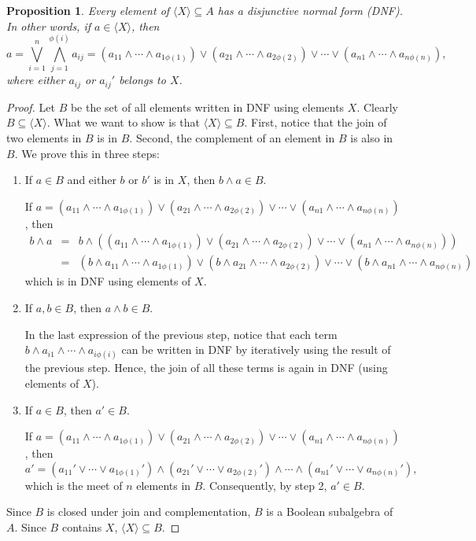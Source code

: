 \documentclass[12pt]{article}
\newtheorem{prop}{Proposition}
\begin{document}
\begin{prop}  Every element of $\langle X\rangle \subseteq A$ has a disjunctive normal form (DNF).  In other words, if $a\in \langle X\rangle$, then $$a=\bigvee_{i=1}^{n} \bigwedge_{j=1}^{\phi(i)} a_{ij}=(a_{11}\wedge \cdots \wedge a_{1\phi(1)})\vee (a_{21}\wedge \cdots \wedge a_{2\phi(2)}) \vee \cdots \vee (a_{n1}\wedge \cdots \wedge a_{n\phi(n)}),$$ where either $a_{ij}$ or $a_{ij}'$ belongs to $X$.
\end{prop}
\begin{proof}
Let $B$ be the set of all elements written in DNF using elements $X$.  Clearly $B\subseteq \langle X\rangle$.  What we want to show is that $\langle X\rangle \subseteq B$.  First, notice that the join of two elements in $B$ is in $B$.  Second, the complement of an element in $B$ is also in $B$.  We prove this in three steps:
\begin{enumerate}
\item If $a\in B$ and either $b$ or $b'$ is in $X$, then $b\wedge a\in B$.  

If $a=(a_{11}\wedge \cdots \wedge a_{1\phi(1)})\vee (a_{21}\wedge \cdots \wedge a_{2\phi(2)}) \vee \cdots \vee (a_{n1}\wedge \cdots \wedge a_{n\phi(n)})$, then 
\begin{eqnarray*}
b\wedge a &=& b\wedge ((a_{11}\wedge \cdots \wedge a_{1\phi(1)})\vee (a_{21}\wedge \cdots \wedge a_{2\phi(2)}) \vee \cdots \vee (a_{n1}\wedge \cdots \wedge a_{n\phi(n)})) \\
&=& (b\wedge a_{11}\wedge \cdots \wedge a_{1\phi(1)})\vee (b\wedge a_{21}\wedge \cdots \wedge a_{2\phi(2)}) \vee \cdots \vee (b\wedge a_{n1}\wedge \cdots \wedge a_{n\phi(n)}) 
\end{eqnarray*}
which is in DNF using elements of $X$.
\item If $a,b\in B$, then $a\wedge b\in B$.

In the last expression of the previous step, notice that each term $b\wedge a_{i1}\wedge \cdots \wedge a_{i\phi(i)}$ can be written in DNF by iteratively using the result of the previous step.  Hence, the join of all these terms is again in DNF (using elements of $X$).
\item If $a\in B$, then $a'\in B$.

If $a=(a_{11}\wedge \cdots \wedge a_{1\phi(1)})\vee (a_{21}\wedge \cdots \wedge a_{2\phi(2)}) \vee \cdots \vee (a_{n1}\wedge \cdots \wedge a_{n\phi(n)})$, then $$a'=(a_{11}'\vee \cdots \vee a_{1\phi(1)}')\wedge (a_{21}'\vee \cdots \vee a_{2\phi(2)}') \wedge \cdots \wedge (a_{n1}'\vee \cdots \vee a_{n\phi(n)}'),$$ which is the meet of $n$ elements in $B$.  Consequently, by step 2, $a'\in B$.
\end{enumerate}
Since $B$ is closed under join and complementation, $B$ is a Boolean subalgebra of $A$.  Since $B$ contains $X$, $\langle X\rangle \subseteq B$.
\end{proof}
\end{document}
